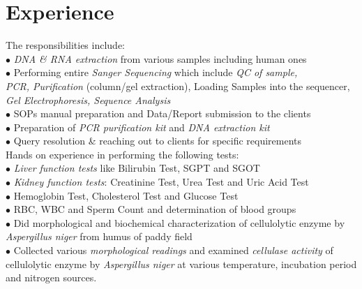\documentclass[letterpaper]{twentysecondcv} %
\begin{document}

\section{Experience}

\begin{twenty} %
	{The responsibilities include:\\
	$\bullet$ \emph{ DNA \& RNA extraction} from various samples including human ones\\
	$\bullet$ Performing entire \emph{ Sanger Sequencing} which include \emph{QC of sample,\\ \phantom{i}  PCR, Purification} (column/gel extraction), Loading Samples into \phantom{ix}the sequencer,\emph{ Gel Electrophoresis, Sequence Analysis}\\
	$\bullet$ SOPs manual preparation and Data/Report submission to the clients\\
	$\bullet$ Preparation of\emph{ PCR purification kit} and \emph{ DNA extraction kit}\\
	$\bullet$ Query resolution \& reaching out to clients for specific requirements\\
	}
	{Hands on experience in performing the following tests:\\
	$\bullet$ \emph{Liver function tests} like Bilirubin Test, SGPT and SGOT\\
	$\bullet$\emph{ Kidney function tests}: Creatinine Test, Urea Test and Uric Acid Test\\
	$\bullet$ Hemoglobin Test, Cholesterol Test and  Glucose  Test\\
	$\bullet$ RBC, WBC and Sperm Count and determination of blood groups\\
	}
	{$\bullet$ Did morphological and biochemical characterization of cellulolytic \phantom{ix}enzyme by \emph{Aspergillus niger} from humus of paddy field\\
	$\bullet$ Collected various\emph{ morphological readings} and examined \emph{cellulase  \phantom{ix}activity} of cellulolytic enzyme by \emph{Aspergillus niger} at various \phantom{ix}temperature, incubation period and nitrogen sources.\\\\
	}

\end{twenty}
\end{document}
